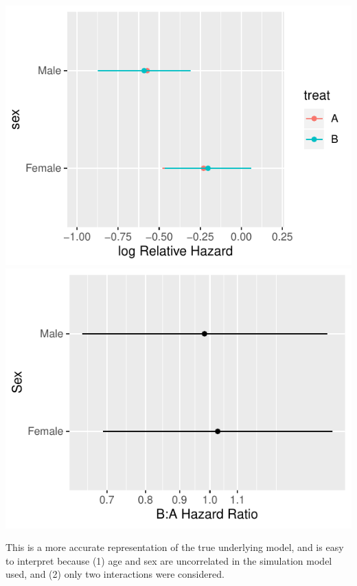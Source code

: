\centerline{\includegraphics[width=\maxwidth]{ancova-htejoint-1} \includegraphics[width=\maxwidth]{ancova-htejoint-2} }


This is a more accurate representation of the true underlying model, and is easy to interpret because (1) age and sex are uncorrelated in the simulation model used, and (2) only two interactions were considered. 

